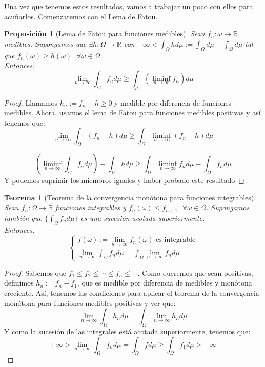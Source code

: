 \documentclass[11pt, a4paper]{article}
\newcommand{\R}{\mathbb{R}}
\theoremstyle{theorem-style}
\newtheorem{nth}{Teorema}[section]
\newtheorem{nprop}{Proposición}[section]
\theoremstyle{definition-style}
\theoremstyle{remark-style}
\theoremstyle{example-style}
\begin{document}
Una vez que tenemos estos resultados, vamos a trabajar un poco con ellos para acuñarlos. Comenzaremos con el Lema de Fatou.

\begin{nprop}[Lema de Fatou para funciones medibles]
	Sean $f_n: \omega \to \R$ medibles. Supongamos que $\exists h: \Omega \to \R$ con $-\infty < \int_\Omega h d\mu := \int_\Omega d\mu - \int_\Omega d\mu $ tal que $f_n(\omega) \geq h(\omega) \ \ \ \forall \omega \in \Omega$.\\
	Entonces:
	$$ \lim_{n\to \infty}\int_\Omega f_n d\mu \geq \int_\mu (\liminf_{n\to \infty}f_n )d\mu$$
\end{nprop}
\begin{proof}
	Llamamos $h_n:= f_n - h \geq 0$ y medible por diferencia de funciones medibles. Ahora, usamos el lema de Fatou para funciones medibles positivas y así tenemos que:
	$$ \lim_{n\to \infty} \int_\Omega (f_n -h) d\mu \geq \int_\Omega \liminf_{n\to \infty}(f_n - h) d\mu$$
	
	$$ ( \liminf_{n\to \infty}\int_\Omega f_n d\mu )  - \int_\Omega h d\mu \geq \int_\Omega \liminf_{n\to \infty} f_n d\mu - \int_\Omega f_n d\mu$$
	Y podemos suprimir los miembros iguales y haber probado este resultado
\end{proof} 

\begin{nth}[Teorema de la convergencia monótona para funciones integrables]
Sean $f_n: \Omega \to \R$ funciones integrables y $f_n(\omega) \leq f_{n+1} \ \ \ \forall \omega \in \Omega$. Supongamos también que $\{\int_\Omega f_n d\mu\}$ es una sucesión acotada superiormente.\\
Entonces:
$$ \begin{cases}
	f(\omega):= \lim_{n\to \infty}f_n(\omega) \text{ es integrable}\\
	\lim_{n \to \infty} \int_\Omega f_n d\mu = \int_{\Omega}\lim_{n\to \infty} f_n d\mu
\end{cases}$$
	
\end{nth}
\begin{proof}
	Sabemos que $f_1 \leq f_2 \leq \cdots \leq f_n \leq \cdots $. Como queremos que sean positivas, definimos $h_n:= f_n - f_1$, que es medible por diferencia de medibles y monótona creciente. Así, tenemos las condiciones para aplicar el teorema de la convergencia monótona para funciones medibles positivas y ver que:
	$$ \lim_{n \to \infty} \int_\Omega h_n d\mu = \int_\Omega \lim_{n \to \infty}h_n d\mu$$
	Y como la sucesión de las integrales está acotada superiormente, tenemos que:
	$$ +\infty > \lim_{n\to \infty} \int_\Omega f_n d\mu = \int_\Omega f d\mu \geq \int_\Omega f_1 d\mu > -\infty$$
\end{proof}
\end{document}
